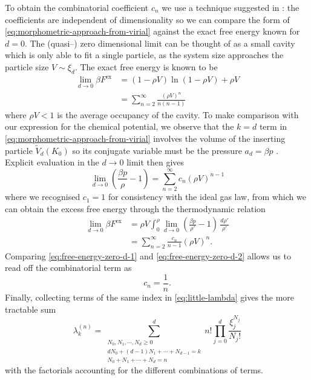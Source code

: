 \documentclass[11pt,twoside]{report}
\begin{document}
To obtain the combinatorial coefficient $c_n$ we use a technique suggested in \cite{MarechalPRE2014}: the coefficients are independent of dimensionality so we can compare the form of \eqref{eq:morphometric-approach-from-virial} against the exact free energy known for $d=0$.
The (quasi--) zero dimensional limit can be thought of as a small cavity which is only able to fit a single particle, as the system size approaches the particle size $V \sim \xi_d$.
The exact free energy is known to be \cite{RosenfeldJPCM1996,MarechalPRE2014}
\begin{equation}\label{eq:free-energy-zero-d-1}
  \begin{split}
    \lim_{d \to 0}
    \beta F^\mathrm{ex}
    &=
    (1 - \rho V) \ln{(1 - \rho V)} + \rho V
    \\ &=
    \sum_{n=2}^\infty \frac{(\rho V)^n}{n(n-1)}
  \end{split}
\end{equation}
where $\rho V < 1$ is the average occupancy of the cavity.
To make comparison with our expression for the chemical potential, we observe that the $k=d$ term in \eqref{eq:morphometric-approach-from-virial} involves the volume of the inserting particle $\widetilde{V}_d(K_0)$ so its conjugate variable must be the pressure $a_d = \beta p$ \cite{ReissJCP1959}.
Explicit evaluation in the $d \to 0$ limit then gives
\begin{equation*}
  \lim_{d \to 0}
  \left(
  \frac{\beta p}{\rho} - 1
  \right)
  =
  \sum_{n=2}^\infty c_n (\rho V)^{n-1}
\end{equation*}
where we recognised $c_1 = 1$ for consistency with the ideal gas law, from which we can obtain the excess free energy through the thermodynamic relation
\begin{equation}\label{eq:free-energy-zero-d-2}
  \begin{split}
    \lim_{d \to 0}
    \beta F^\mathrm{ex}
    &=
    \rho V \int_0^\rho
    \lim_{d \to 0}
    \left(
    \frac{\beta p}{\rho'} - 1
    \right)
    \, \frac{d\rho'}{\rho'}
    \\ &=
    \sum_{n=2}^\infty
    \frac{c_n}{n-1} (\rho V)^n.
  \end{split}
\end{equation}
Comparing \eqref{eq:free-energy-zero-d-1} and \eqref{eq:free-energy-zero-d-2} allows us to read off the combinatorial term as
\begin{equation}\label{eq:c-coefficient}
  c_n = \frac{1}{n}.
\end{equation}
Finally, collecting terms of the same index in \eqref{eq:little-lambda} gives the more tractable sum \cite{MarechalPRE2014}
\begin{equation}\label{eq:horrible-lambda-sum}
  \lambda_k^{(n)}
  =
  \sum_{\substack{
      N_0, N_1, \cdots, N_d \ge 0 \\
      d N_0 + (d-1)N_1 + \cdots + N_{d-1} = k \\
      N_0 + N_1 + \cdots + N_d = n}}^d
  n!
  \prod_{j=0}^d
  \frac{\xi_{j}^{N_j}}{N_j!}
\end{equation}
with the factorials accounting for the different combinations of terms.
\end{document}
